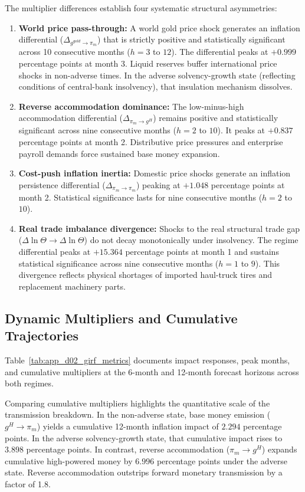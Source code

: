 The multiplier differences establish four systematic structural asymmetries:
\begin{enumerate}[leftmargin=*,itemsep=1pt]
    \item \textbf{World price pass-through:} A world gold price shock generates an inflation differential ($\Delta_{g^{gold} \to \pi_m}$) that is strictly positive and statistically significant across 10 consecutive months ($h=3$ to $12$). The differential peaks at $+0.999$ percentage points at month 3. Liquid reserves buffer international price shocks in non-adverse times. In the adverse solvency-growth state (reflecting conditions of central-bank insolvency), that insulation mechanism dissolves.
    \item \textbf{Reverse accommodation dominance:} The low-minus-high accommodation differential ($\Delta_{\pi_m \to g^H}$) remains positive and statistically significant across nine consecutive months ($h=2$ to $10$). It peaks at $+0.837$ percentage points at month 2. Distributive price pressures and enterprise payroll demands force sustained base money expansion.
    \item \textbf{Cost-push inflation inertia:} Domestic price shocks generate an inflation persistence differential ($\Delta_{\pi_m \to \pi_m}$) peaking at $+1.048$ percentage points at month 2. Statistical significance lasts for nine consecutive months ($h=2$ to $10$).
    \item \textbf{Real trade imbalance divergence:} Shocks to the real structural trade gap ($\Delta\ln\Theta \to \Delta\ln\Theta$) do not decay monotonically under insolvency. The regime differential peaks at $+15.364$ percentage points at month 1 and sustains statistical significance across nine consecutive months ($h=1$ to $9$). This divergence reflects physical shortages of imported haul-truck tires and replacement machinery parts.
\end{enumerate}

\subsection{Dynamic Multipliers and Cumulative Trajectories}
Table~\ref{tab:app_d02_girf_metrics} documents impact responses, peak months, and cumulative multipliers at the 6-month and 12-month forecast horizons across both regimes. 



Comparing cumulative multipliers highlights the quantitative scale of the transmission breakdown. In the non-adverse state, base money emission ($g^H \to \pi_m$) yields a cumulative 12-month inflation impact of $2.294$ percentage points. In the adverse solvency-growth state, that cumulative impact rises to $3.898$ percentage points. In contrast, reverse accommodation ($\pi_m \to g^H$) expands cumulative high-powered money by $6.996$ percentage points under the adverse state. Reverse accommodation outstrips forward monetary transmission by a factor of 1.8. 

